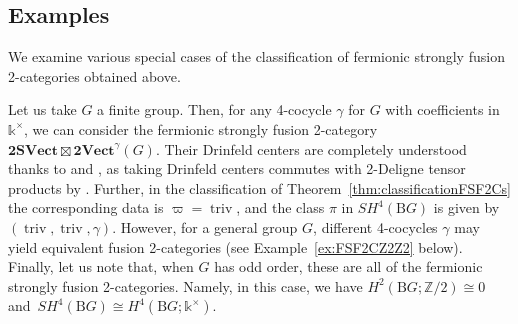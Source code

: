\documentclass[pdftex]{sigma}
\numberwithin{equation}{section}
\begin{document}
\subsection{Examples}

We examine various special cases of the classification of fermionic strongly fusion 2-categories obtained above.

\begin{Example}\label{ex:topcocycleonly}
Let us take $G$ a finite group. Then, for any 4-cocycle $\gamma$ for $G$ with coefficients in $\mathds{k}^{\times}$, we can consider the fermionic strongly fusion 2-category $\mathbf{2SVect}\boxtimes \mathbf{2Vect}^{\gamma}(G)$. Their Drinfeld centers are completely understood thanks to \cite{KTZ} and \cite{JF2}, as taking Drinfeld centers commutes with 2-Deligne tensor products by \cite{D9}. Further, in the classification of Theorem~\ref{thm:classificationFSF2Cs} the corresponding data is $\varpi = \operatorname{triv}$, and the class $\pi$ in $SH^4(\mathrm{B}G)$ is given by $(\operatorname{triv}, \operatorname{triv}, \gamma)$. However, for a general group $G$, different 4-cocycles $\gamma$ may yield equivalent fusion 2-categories (see Example~\ref{ex:FSF2CZ2Z2} below). Finally, let us note that, when $G$ has odd order, these are all of the fermionic strongly fusion 2-categories. Namely, in this case, we have $H^2(\mathrm{B}G;\mathbb{Z}/2)\cong 0$ and~$SH^{4}(\mathrm{B}G)\cong H^4(\mathrm{B}G;\mathds{k}^{\times})$.
\end{Example}
\end{document}
